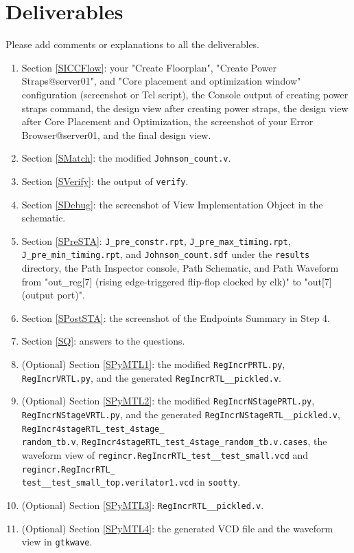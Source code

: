 \documentclass[a4paper,12pt,twoside]{article}
\begin{document}
\newpage
\section{Deliverables}
Please add comments or explanations to all the deliverables.
\begin{enumerate}
    \item Section \ref{SICCFlow}: your "Create Floorplan", "Create Power Straps@server01", and "Core placement and optimization window" configuration (screenshot or Tcl script), the Console output of creating power straps command, the design view after creating power straps, the design view after Core Placement and Optimization, the screenshot of your Error Browser@server01, and the final design view.
    \item Section \ref{SMatch}: the modified \texttt{Johnson\_count.v}.
    \item Section \ref{SVerify}: the output of \texttt{verify}.
    \item Section \ref{SDebug}: the screenshot of View Implementation Object in the schematic.
    \item Section \ref{SPreSTA}: \texttt{J\_pre\_constr.rpt}, \texttt{J\_pre\_max\_timing.rpt}, \texttt{J\_pre\_min\_timing.rpt}, and \texttt{Johnson\_count.sdf} under the \texttt{results} directory, the Path Inspector console, Path Schematic, and Path Waveform from "out\_reg[7] (rising edge-triggered flip-flop clocked by clk)" to "out[7] (output port)".
    \item Section \ref{SPostSTA}: the screenshot of the Endpoints Summary in Step 4.
    \item Section \ref{SQ}: answers to the questions.
    \item (Optional) Section \ref{SPyMTL1}: the modified \texttt{RegIncrPRTL.py}, \texttt{RegIncrVRTL.py}, and the generated \texttt{RegIncrRTL\_\_pickled.v}.
    \item (Optional) Section \ref{SPyMTL2}: the modified \texttt{RegIncrNStagePRTL.py}, \texttt{RegIncrNStageVRTL.py}, and the generated \texttt{RegIncrNStageRTL\_\_pickled.v}, \texttt{RegIncr4stageRTL\_test\_4stage\_\\
    random\_tb.v}, \texttt{RegIncr4stageRTL\_test\_4stage\_random\_tb.v.cases}, the waveform view of \texttt{regincr.RegIncrRTL\_test\_\_test\_small.vcd} and \texttt{regincr.RegIncrRTL\_\\
    test\_\_test\_small\_top.verilator1.vcd} in \texttt{sootty}.
    \item (Optional) Section \ref{SPyMTL3}: \texttt{RegIncrRTL\_\_pickled.v}.
    \item (Optional) Section \ref{SPyMTL4}: the generated VCD file and the waveform view in \texttt{gtkwave}.
\end{enumerate}
\end{document}

